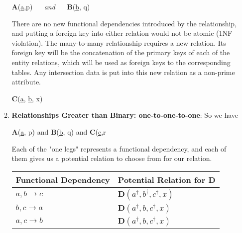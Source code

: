 \documentclass{report}
\begin{document}
\begin{itemize}
\begin{enumerate}
                    \begin{center}
                        \textbf{A}(\underline{a},p) $\quad$ \textit{and} $\quad$ \textbf{B}(\underline{b}, q)
                    \end{center}
                    \bigbreak \noindent 
                    There are no new functional dependencies introduced by the relationship, and putting a foreign key into either relation would not be atomic (1NF violation). The many-to-many relationship requires a new relation. Its foreign key will be the concatenation of the primary keys of each of the entity relations, which will be used as foreign keys to the corresponding tables. Any intersection data is put into this new relation as a non-prime attribute.
                    \bigbreak \noindent 
                    \begin{center}
                        \textbf{C}(\underline{a}\dag, \underline{b}\dag, x)
                    \end{center}
                \item \textbf{Relationships Greater than Binary: one-to-one-to-one}:
                    \bigbreak \noindent 
                    \bigbreak \noindent 
                    So we have 
                    \begin{center}
                        \textbf{A}(\underline{a}, p) and \textbf{B}(\underline{b}, q) and \textbf{C}(\underline{c},r
                    \end{center}
                    \bigbreak \noindent 
                    Each of the "one legs" represents a functional dependency, and each of them gives us a potential relation to choose from for our relation.
                    \bigbreak \noindent 
                    \begin{table}[h!]
                        \centering
                        \begin{tabular}{ll}
                            \toprule
                            \textbf{Functional Dependency} & \textbf{Potential Relation for \textbf{D}} \\ 
                            \midrule
                            $a, b \rightarrow c$ & $\mathbf{D} \left( a^\dagger, b^\dagger, c^\dagger, x \right)$ \\[8pt]
                            $b, c \rightarrow a$ & $\mathbf{D} \left( a^\dagger, b, c^\dagger, x \right)$ \\[8pt]
                            $a, c \rightarrow b$ & $\mathbf{D} \left( a^\dagger, b, c^\dagger, x \right)$ \\ 

\end{tabular}
\end{table}
\end{enumerate}
\end{itemize}
\end{document}
